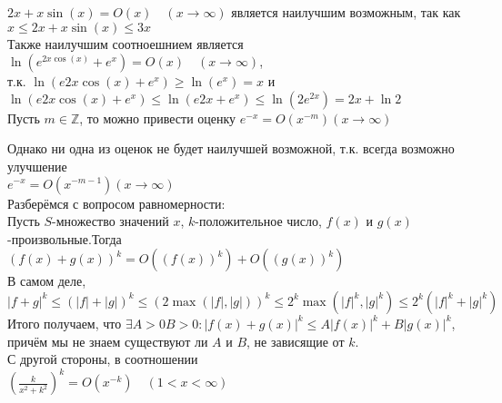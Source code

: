 \documentclass{report}
\begin{document}
$2x+x\sin(x)=O(x)\quad(x\to\infty)$ является наилучшим возможным, так как \\ 
$x\le2x+x\sin(x)\le3x$ \\
Также наилучшим соотноешнием является \\
$\ln(e^{2x\cos(x)}+e^{x})=O(x)\quad(x\to\infty)$, \\
т.к. $\ln(e{2x\cos(x)}+e^{x})\geq\ln(e^{x})=x$ и $\ln(e{2x\cos(x)}+e^{x})\leq\ln(e{2x}+e^{x})\leq\ln(2e^{2x})=2x+\ln2$ \\
Пусть $m\in\mathbb{Z}$, то можно привести оценку $e^{-x}=O(x^{-m})(x\to\infty)$
\begin{center}
\end{center}
Однако ни одна из оценок не будет наилучшей возможной, т.к. всегда возможно улучшение \\ $e^{-x}=O(x^{-m-1})(x\to\infty)$ \\
Разберёмся с вопросом равномерности: \\
Пусть $S$-множество значений $x$, $k$-положительное число, $f(x)$ и $g(x)$-произвольные.Тогда \\
${(f(x)+g(x))}^{k}=O({(f(x))}^{k})+O({(g(x))}^{k})$ \\
В самом деле, \\
$|f+g|^{k}\le{(|f|+|g|)}^{k}\leq{(2\max(|f|,|g|))}^{k}\leq2^{k}\max(|f|^{k},|g|^{k})\leq2^{k}(|f|^{k}+|g|^{k})$ \\
Итого получаем, что $\exists A>0B>0: {|f(x)+g(x)|}^{k}\le A|f(x)|^{k}+B|g(x)|^{k}$, причём мы не знаем существуют ли $A$ и $B$, не зависящие от $k$. \\
С другой стороны, в соотношении \\
${(\frac{k}{x^{2}+k^{2}})}^{k}=O(x^{-k})\quad(1<x<\infty)$ \\
\end{document}
